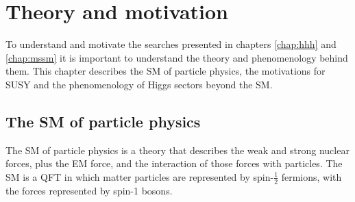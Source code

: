 \chapter{Theory and motivation}
\label{chap:theory}
To understand and motivate the searches presented in chapters 
\ref{chap:hhh} and \ref{chap:mssm} it is important
to understand the theory and phenomenology behind them. 
This chapter describes the \acl{SM} of particle physics, the
motivations for \acl{SUSY} and the phenomenology of Higgs
sectors beyond the \acl{SM}.

\section{The \acl{SM} of particle physics}
\label{sec:theory_sm}
The \ac{SM} of particle physics is a theory that describes the weak and strong
nuclear forces, plus the \ac{EM} force, and the interaction of those forces
with particles. The \ac{SM} is a \ac{QFT} in which matter particles
are represented by spin-$\frac{1}{2}$ fermions, with the forces represented
by spin-1 bosons.

